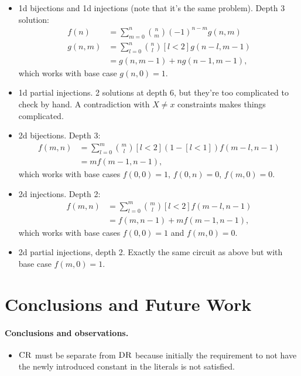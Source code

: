 \documentclass{article}
\theoremstyle{definition}
\theoremstyle{remark}
\DeclareMathOperator{\CR}{\textsc{CR}}
\DeclareMathOperator{\DR}{\textsc{DR}}
\begin{document}
\begin{itemize}
\item 1d bijections and 1d injections (note that it's the same problem). Depth 3 solution:
  \begin{align*}
    f(n) &= \sum_{m=0}^n \binom{n}{m} (-1)^{n-m}g(n, m) \\
    g(n, m) &= \sum_{l=0}^n \binom{n}{l}[l < 2]g(n-l, m-1) \\
    &= g(n, m - 1) + ng(n - 1, m - 1),
  \end{align*}
  which works with base case $g(n, 0) = 1$.
\item 1d partial injections. 2 solutions at depth 6, but they're too complicated to check by hand. A contradiction with $X \ne x$ constraints makes things complicated.
\item 2d bijections. Depth 3:
  \begin{align*}
    f(m, n) &= \sum_{l=0}^m \binom{m}{l} [l < 2] (1 - [l < 1])f(m-l, n-1) \\
    &= mf(m-1, n-1),
  \end{align*}
  which works with base cases $f(0, 0) = 1$, $f(0, n) = 0$, $f(m, 0) = 0$.
\item 2d injections. Depth 2:
  \begin{align*}
    f(m, n) &= \sum_{l=0}^m \binom{m}{l}[l<2]f(m-l, n-1) \\
    &= f(m, n-1) + mf(m-1, n-1),
  \end{align*}
  which works with base cases $f(0, 0) = 1$ and $f(m, 0) = 0$.
\item 2d partial injections, depth 2. Exactly the same circuit as above but with base case $f(m, 0) = 1$.
\end{itemize}

\section{Conclusions and Future Work}

\paragraph{Conclusions and observations.}
\begin{itemize}
\item $\CR$ must be separate from $\DR$ because initially the requirement to not have the newly introduced constant in the literals is not satisfied.
\end{itemize}
\end{document}
